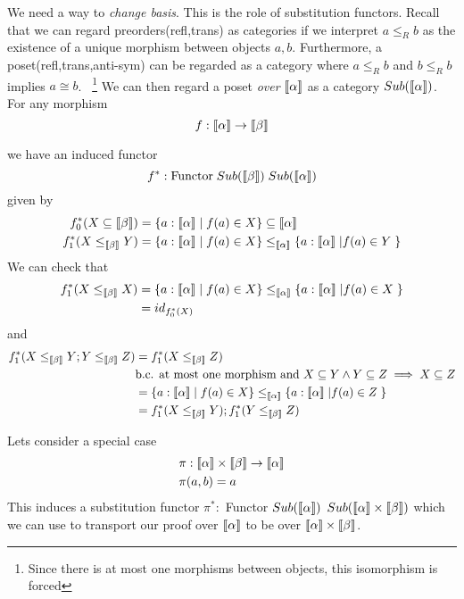 \documentclass{article}
\begin{document}
We need a way to \textit{change basis}. This is the role of substitution functors. 
Recall that we can regard preorders(refl,trans) as categories if we interpret $a \leq_R b$ as the existence of a unique morphism between objects $a,b$.
Furthermore, a poset(refl,trans,anti-sym) can be regarded as a category where $a \leq_R b$ and $b \leq_R b$ implies $a \cong b$. \
\footnote{Since there is at most one morphisms between objects, this isomorphism is forced}
We can then regard a poset \textit{over} $\llbracket \alpha \rrbracket$ as a category $Sub(\llbracket \alpha \rrbracket)$.
For any morphism 
\[
 f : \llbracket \alpha \rrbracket \rightarrow \llbracket \beta \rrbracket   
\]

we have an induced functor
\[
 f^* : \textrm{Functor} \;Sub(\llbracket \beta \rrbracket) \; Sub(\llbracket \alpha \rrbracket)
\]
given by 
\begin{align*}
    f^*_0 (X \subseteq \llbracket \beta \rrbracket) &= \{a : \llbracket \alpha \rrbracket \;|\; f(a) \in X\} \subseteq \llbracket \alpha \rrbracket\\
    f^*_1 (X \leq_{\llbracket \beta \rrbracket} Y) &= \{ a : \llbracket \alpha \rrbracket \; | \; f(a) \in X\}\leq_{\llbracket \alpha \rrbracket} \{ a : \llbracket \alpha \rrbracket \; | f(a) \in Y\; \}\\
\end{align*}
We can check that 
\begin{align*}
    f^*_1(X \leq_{\llbracket \beta \rrbracket} X) &= \{ a : \llbracket \alpha \rrbracket \; | \; f(a) \in X\}\leq_{\llbracket \alpha \rrbracket} \{ a : \llbracket \alpha \rrbracket \; | f(a) \in X\; \}\\
    &= id_{f^*_0(X)}
\end{align*}
and 
\begin{align*}
    f^*_1(X \leq_{\llbracket \beta \rrbracket}  Y ; Y \leq_{\llbracket \beta \rrbracket}  Z) &=   f^*_1(X \leq_{\llbracket \beta \rrbracket}  Z)\\
    & \textrm{b.c. at most one morphism and } X \subseteq Y \land Y \subseteq Z \implies X \subseteq Z\\
    &= \{ a : \llbracket \alpha \rrbracket \; | \; f(a) \in X\}\leq_{\llbracket \alpha \rrbracket} \{ a : \llbracket \alpha \rrbracket \; | f(a) \in Z\; \}\\
    &= f^*_1(X \leq_{\llbracket \beta \rrbracket}  Y) ; f^*_1(Y \leq_{\llbracket \beta \rrbracket}  Z)\\
\end{align*}

Lets consider a special case 
\begin{align*}
    &\pi: \llbracket \alpha \rrbracket\times\llbracket \beta \rrbracket\rightarrow\llbracket \alpha \rrbracket\\
    &\pi (a,b) = a \\
\end{align*}
This induces a substitution functor $\pi^* :$ Functor $Sub(\llbracket \alpha \rrbracket)$ $Sub(\llbracket \alpha \rrbracket \times \llbracket \beta \rrbracket)$ 
which we can use to transport our proof over $\llbracket \alpha \rrbracket$ to be over $\llbracket \alpha \rrbracket\times \llbracket \beta \rrbracket$.
\end{document}
